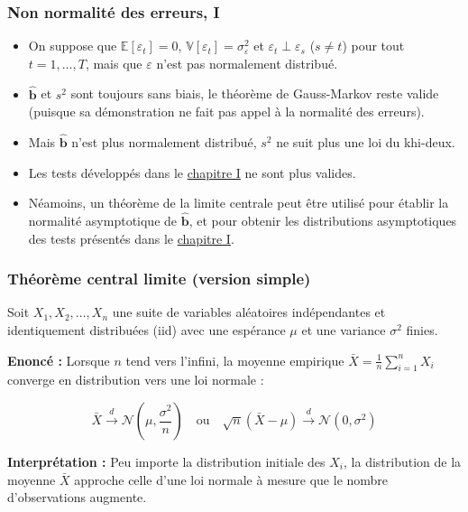 \documentclass[10pt]{beamer}
\newcommand{\epsvar}{\sigma_{\varepsilon}^2}
\theoremstyle{plain}
\begin{document}
\begin{frame}
  \frametitle{Non normalité des erreurs, I}

  \begin{itemize}

  \item On suppose que $\mathbb E\left[ \varepsilon_t \right] = 0$, $\mathbb V\left[ \varepsilon_t \right] = \epsvar$ et $\varepsilon_t\perp\varepsilon_s$ ($s\neq t$) pour tout $t=1,\dots,T$, mais que $\varepsilon$ n'est pas normalement distribué.\newline

  \item $\hat{\mathbf b}$ et $s^2$ sont toujours sans biais, le théorème de Gauss-Markov reste valide (puisque sa démonstration ne fait pas appel à la normalité des erreurs).\newline

  \item Mais  $\hat{\mathbf b}$ n'est plus normalement distribué, $s^2$ ne suit plus une loi du khi-deux.\newline

  \item Les tests développés dans le \href{https://le-mans.adjemian.eu/econometrics/chapitre-1.pdf}{chapitre I} ne sont plus valides.\newline

  \item Néamoins, un théorème de la limite centrale peut être utilisé pour établir la normalité asymptotique de $\hat{\mathbf b}$, et pour obtenir les distributions asymptotiques des tests présentés dans le \href{https://le-mans.adjemian.eu/econometrics/chapitre-1.pdf}{chapitre I}.

  \end{itemize}

\end{frame}



\begin{frame}
  \frametitle{Théorème central limite (version simple)}

  Soit $X_1, X_2, \ldots, X_n$ une suite de variables aléatoires indépendantes et identiquement distribuées (iid) avec une espérance $\mu$ et une variance $\sigma^2$ finies.

  \medskip

  \textbf{Enoncé :} Lorsque $n$ tend vers l'infini, la moyenne empirique $\bar{X} = \frac{1}{n} \sum_{i=1}^n X_i$ converge en distribution vers une loi normale :

  \[
  \bar{X} \xrightarrow{d} \mathcal{N}(\mu, \frac{\sigma^2}{n}) \quad \text{ou} \quad \sqrt{n}(\bar{X} - \mu) \xrightarrow{d} \mathcal{N}(0, \sigma^2)
  \]

  \medskip

  \textbf{Interprétation :} Peu importe la distribution initiale des $X_i$, la distribution de la moyenne $\bar{X}$ approche celle d'une loi normale à mesure que le nombre d'observations augmente.

\end{frame}
\end{document}

